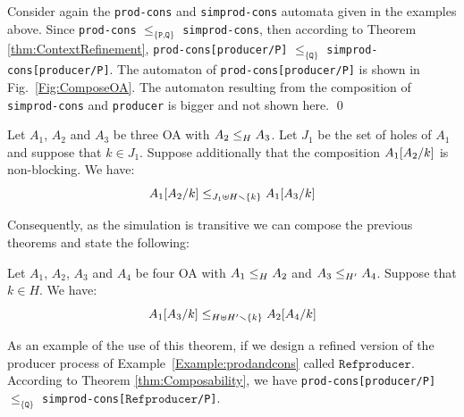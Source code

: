 \documentclass[runningheads]{llncs}
\begin{document}
\begin{example}  Consider again the \texttt{prod-cons} and \texttt{simprod-cons}  automata given in the examples above.  Since  \texttt{prod-cons} $\leq_{\{\texttt{P,Q}\}}$ \texttt{simprod-cons},  then according to Theorem \ref{thm:ContextRefinement}, 
\texttt{prod-cons[producer/P]} $\leq_{\{\texttt{Q}\}}$  \texttt{simprod-cons[producer/P]}. 
The automaton of \texttt{prod-cons[producer/P]} is shown in Fig.~\ref{Fig:ComposeOA}. The automaton resulting  from the composition of  \texttt{simprod-cons} and \texttt{producer} is bigger and not shown here. \qed
\end{example}


\begin{theorem}[Congruence]\label{thm:CongurenceRefinement}
Let $A_1$, $A_2$ and $A_3$ be three OA with $\wrel{A_2}{A_3}{H}$. 
  Let $J_1$ be the set of holes of $A_1$ and suppose that \(k \in J_1\). Suppose additionally that the composition $A_1\subst{A_2}{k}$ is non-blocking.
We have: \[\wrel{A_1\subst{A_2}{k}}{A_1\subst{A_3}{k}}{J_1 \uplus H \setminus \mbrc{k}}\]
\end{theorem}

Consequently, as the simulation is transitive we can compose the previous theorems and  state the following: 
\begin{theorem}[Composability]\label{thm:Composability}
Let $A_1$, $A_2$, $A_3$ and $A_4$ be four OA with $\wrel{A_1}{A_2}{H}$ and $\wrel{A_3}{A_4}{H'}$.  Suppose that \(k \in H\). We have: \[\wrel{A_1\subst{A_3}{k}}{A_2\subst{A_4}{k}}{ H \uplus H'\setminus \mbrc{k}}\]
\end{theorem}

\begin{example}
As an example of the use of this theorem, if we design a refined version of the producer process of Example~\ref{Example:prodandcons} called $\texttt{Refproducer}$. According to  Theorem \ref{thm:Composability}, we have 
\texttt{prod-cons[producer/P]} $\leq_{\{\texttt{Q}\}}$  \texttt{simprod-cons[$\texttt{Refproducer}$/P]}. 
\end{example}


\end{document}
